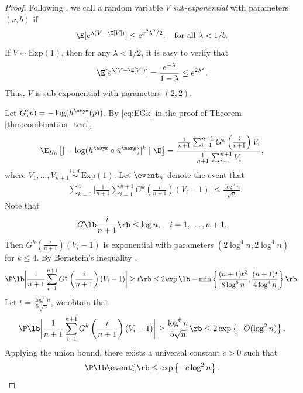 \begin{proof}
  Following \cite{wainwright2019high}, we call a random variable $V$ \emph{sub-exponential} with parameters $(\nu, b)$ if
  \[\E[e^{\lambda(V - \E[V])}]\le e^{\nu^2\lambda^2 / 2}, \quad \text{for all }\lambda < 1 / b.\]
  If $V \sim \mathrm{Exp}(1)$, then for any $\lambda < 1/2$, it is easy to verify that
  \[\E[e^{\lambda(V - \E[V])}] = \frac{e^{-\lambda}}{1 - \lambda}\le e^{2\lambda^2}.\]
  Thus, $V$ is sub-exponential with parameters $(2, 2)$.

  Let $G(p) = -\log (h^\asym(p))$. By \eqref{eq:EGk} in the proof of Theorem \ref{thm:combination_test},
  \begin{equation}
    \label{eq:E_log_D}
    \E_{H_0}\left[|-\log (h^\asym \circ \hat{u}^\marg)|^k\mid \D\right] = \frac{\frac{1}{n+1}\sum_{i=1}^{n+1}G^k\left(\frac{i}{n+1}\right)V_{i}}{\frac{1}{n+1}\sum_{i=1}^{n+1}V_{i}},
  \end{equation}
  where $V_1, \ldots, V_{n+1}\stackrel{i.i.d.}{\sim} \mathrm{Exp}(1)$. Let $\event_n$ denote the event that
  \begin{align}
    &\sum_{k=0}^{4}\bigg|\frac{1}{n+1}\sum_{i=1}^{n+1}G^k\left(\frac{i}{n+1}\right)(V_{i} - 1)\bigg|\le \frac{\log^6 n}{\sqrt{n}}.    \label{eq:event_En}
  \end{align}
  Note that
  \[G\lb \frac{i}{n+1}\rb\le \log n, \quad i = 1, \ldots, n+1.\]
  Then $G^k\left(\frac{i}{n+1}\right)(V_{i} - 1)$ is exponential with parameters $(2\log^4 n, 2\log^4 n)$ for $k\le 4$. By Bernstein's inequality \citep[e.g.,][Proposition 2.9]{wainwright2019high},
  \[\P\lb\bigg|\frac{1}{n+1}\sum_{i=1}^{n+1}G^k\left(\frac{i}{n+1}\right)(V_{i} - 1)\bigg| \ge t\rb\le 2\exp\lb-\min\left\{\frac{(n+1)t^2}{8\log^8 n}, \frac{(n+1)t}{4\log^4 n}\right\}\rb.\]
  Let $t = \frac{\log^6 n}{5\sqrt{n}}$, we obtain that
  \[\P\lb\bigg|\frac{1}{n+1}\sum_{i=1}^{n+1}G^k\left(\frac{i}{n+1}\right)(V_{i} - 1)\bigg| \ge \frac{\log^6 n}{5\sqrt{n}}\rb\le 2\exp \left\{-O(\log^2 n)\right\}.\]
  Applying the union bound, there exists a universal constant $c > 0$ such that
  \begin{equation}
    \label{eq:prob_event_c}
    \P\lb \event_n^c\rb \le \exp \left\{-c\log^2 n\right\}.
  \end{equation}


\end{proof}
